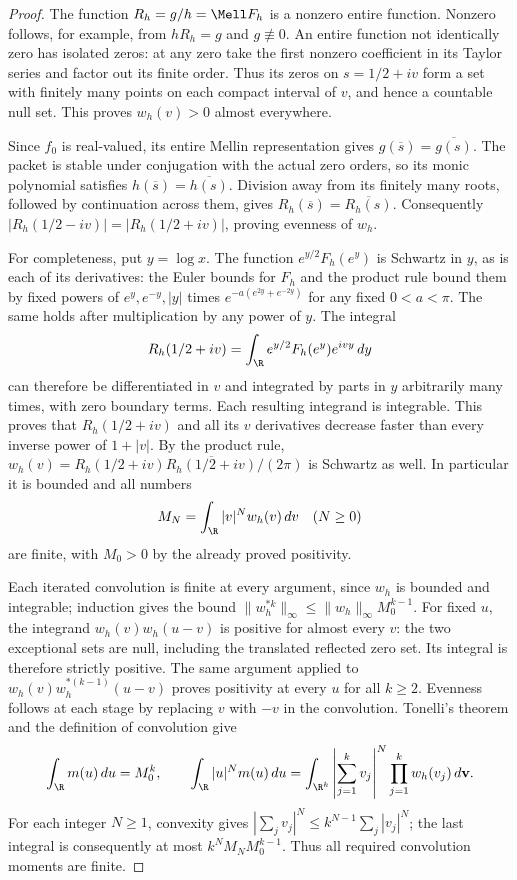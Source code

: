 \begin{proof}
The function $R_h=g/h=\Mell F_h$ is a nonzero entire function.
Nonzero follows, for example, from $hR_h=g$ and $g\not\equiv0$.
An entire function not identically zero has isolated zeros:
at any zero take the first nonzero coefficient in its Taylor
series and factor out its finite order.  Thus its zeros on
$s=1/2+iv$ form a set with finitely many points on each compact
interval of $v$, and hence a countable null set.  This proves
$w_h(v)>0$ almost everywhere.

Since $f_0$ is real-valued, its entire Mellin representation
gives $g(\overline s)=\overline{g(s)}$.  The packet is stable
under conjugation with the actual zero orders, so its monic
polynomial satisfies $h(\overline s)=\overline{h(s)}$.
Division away from its finitely many roots, followed by
continuation across them, gives
$R_h(\overline s)=\overline{R_h(s)}$.  Consequently
$|R_h(1/2-iv)|=|R_h(1/2+iv)|$, proving evenness of $w_h$.

For completeness, put $y=\log x$.  The function
$e^{y/2}F_h(e^y)$ is Schwartz in $y$, as is each of its
derivatives: the Euler bounds for $F_h$ and the product rule
bound them by fixed powers of $e^y,e^{-y},|y|$ times
$e^{-a(e^{2y}+e^{-2y})}$ for any fixed $0<a<\pi$.
The same holds after multiplication by any power of $y$.
The integral
\[
 R_h(1/2+iv)=\int_\R e^{y/2}F_h(e^y)e^{ivy}\,dy
\]
can therefore be differentiated in $v$ and integrated by parts
in $y$ arbitrarily many times, with zero boundary terms.
Each resulting integrand is integrable.  This proves that
$R_h(1/2+iv)$ and all its $v$ derivatives decrease faster
than every inverse power of $1+|v|$.  By the product rule,
$w_h(v)=R_h(1/2+iv)\overline{R_h(1/2+iv)}/(2\pi)$ is
Schwartz as well.  In particular it is bounded and all numbers
\[
 M_N=\int_\R |v|^N w_h(v)\,dv\quad(N\geq0)
\]
are finite, with $M_0>0$ by the already proved positivity.

Each iterated convolution is finite at every argument, since
$w_h$ is bounded and integrable; induction gives the bound
$\|w_h^{*k}\|_\infty\leq\|w_h\|_\infty M_0^{k-1}$.
For fixed $u$, the integrand $w_h(v)w_h(u-v)$ is positive
for almost every $v$: the two exceptional sets are null,
including the translated reflected zero set.  Its integral is
therefore strictly positive.  The same argument applied to
$w_h(v)w_h^{*(k-1)}(u-v)$ proves positivity at every $u$ for
all $k\geq2$.  Evenness follows at each stage by replacing
$v$ with $-v$ in the convolution.  Tonelli's theorem and the
definition of convolution give
\[
 \int_\R m(u)\,du=M_0^k,\qquad
 \int_\R |u|^N m(u)\,du
 =\int_{\R^k}\left|\sum_{j=1}^kv_j\right|^N
                         \prod_{j=1}^kw_h(v_j)\,d\mathbf v.
\]
For each integer $N\geq1$, convexity gives
$|\sum_jv_j|^N\leq k^{N-1}\sum_j|v_j|^N$; the last
integral is consequently at most $k^NM_NM_0^{k-1}$.
Thus all required convolution moments are finite.


\end{proof}
